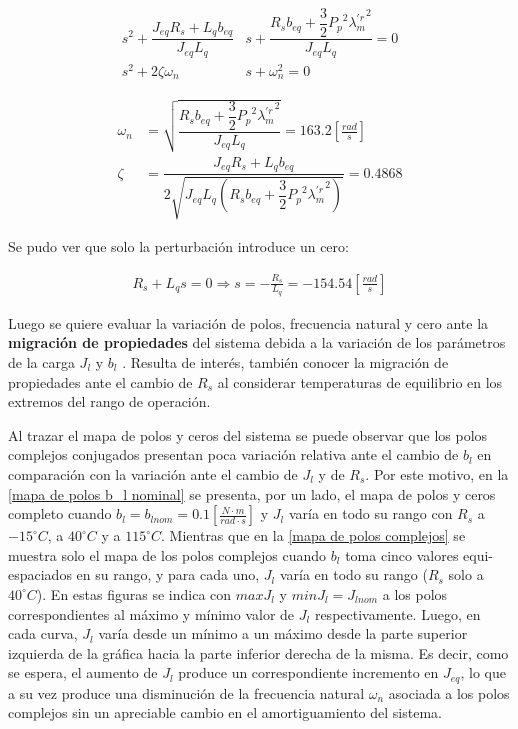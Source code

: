 \documentclass[a4paper, 10pt, onecolumn,journal]{ieeeconf}
\begin{document}
\begin{align}
	s^2 +\dfrac{ J_{eq} R_{s} + L_{q} b_{eq}}{J_{eq} L_{q}} &s +\dfrac{ R_{s} b_{eq} + \dfrac{3}{2} {P_{p}}^2 { \lambda^{'r}_m}^2}{J_{eq} L_{q}}  = 0 \label{polinomio caracteristico del sistema LTI polos complejos conjugados}\\
	s^2 + 2 \zeta \omega_{n} &s + \omega_{n}^{2} = 0 \label{ecuación estandar de un sistema de segundo orden}
\end{align}

\begin{align}
	\omega_{n} &= \sqrt{\dfrac{ R_{s} b_{eq} + \dfrac{3}{2} {P_{p}}^2 { \lambda^{'r}_m}^2}{J_{eq} L_{q}}} = 163.2 \left[\frac{rad}{s}\right] \label{ecuacion de las frecuencias naturales del LTI}\\
	\zeta &= \dfrac{ J_{eq} R_{s} + L_{q} b_{eq}}{2 \sqrt{ J_{eq} L_{q}\left( R_{s} b_{eq} + \dfrac{3}{2} {P_{p}}^2 { \lambda^{'r}_m}^2\right) }} = 0.4868 \label{ecuacion de las relaciones de amortiguamiento del LTI}
\end{align}

Se pudo ver que solo la perturbación introduce un cero:

\begin{align}
	R_{s} + L_{q} s = 0 \Rightarrow s = -\frac{R_{s}}{L_{q}} = -154.54 \left[\frac{rad}{s}\right]
	\label{cero del sistema LTI}
\end{align}


Luego se quiere evaluar la variación de  polos, frecuencia natural y  cero ante la 
\textbf{migración de propiedades} del sistema debida a la variación de los parámetros de la carga
$J_l$ y $b_l$ \cite{c1}. Resulta de interés, también conocer la migración
de propiedades ante el cambio de $R_s$ al considerar temperaturas de equilibrio en los extremos del rango de operación.

Al trazar el mapa de polos y ceros del sistema se puede observar que
los polos complejos conjugados presentan poca variación relativa ante el cambio de $b_l$ en comparación con la variación ante el cambio de $J_l$ y de $R_s$.
Por este motivo, en la \cref{mapa de polos b_l nominal} se presenta, por un lado, el mapa de polos y ceros completo cuando
$b_l = b_{lnom} = 0.1 \left[\frac{N \cdot m}{rad \cdot s}\right]$ y $J_l$ varía en todo su rango con $R_s$ a $-15^\circ C$, a $40^\circ C$ y a $115^\circ C$. Mientras que en la
\cref{mapa de polos complejos} se muestra solo el mapa de los polos complejos cuando
$b_l$ toma cinco valores equi-espaciados en su rango, y para cada uno, $J_l$ varía en todo su rango ($R_s$ solo a $40^\circ C$).
En estas figuras se indica con $max J_{l}$ y $min J_{l} = J_{lnom}$ a los polos correspondientes al máximo y mínimo valor
de $J_{l}$ respectivamente. Luego, en cada curva, $J_l$ varía desde un mínimo a un máximo
desde la parte superior izquierda de la gráfica hacia la parte inferior derecha de la misma. Es decir, como se espera, 
el aumento de $J_{l}$  produce un correspondiente incremento en $J_{eq}$,
lo que a su vez produce una disminución de la frecuencia natural $\omega_n$ asociada a los polos complejos sin un apreciable
cambio en el amortiguamiento del sistema.
\end{document}
